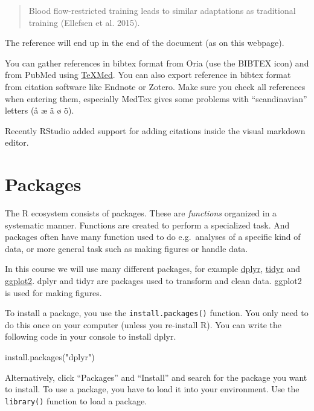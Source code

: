 \documentclass[
  11pt,
  letterpaper,
]{scrbook}
\newenvironment{Shaded}{\begin{snugshade}}{\end{snugshade}}
\newcommand{\FunctionTok}[1]{\textcolor[rgb]{0.28,0.35,0.67}{#1}}
\newcommand{\NormalTok}[1]{\textcolor[rgb]{0.00,0.23,0.31}{#1}}
\newcommand{\StringTok}[1]{\textcolor[rgb]{0.13,0.47,0.30}{#1}}
\begin{document}
\begin{quote}
Blood flow-restricted training leads to similar adaptations as
traditional training (Ellefsen et al. 2015).
\end{quote}

The reference will end up in the end of the document (as on this
webpage).

You can gather references in bibtex format from Oria (use the BIBTEX
icon) and from PubMed using
\href{https://www.bioinformatics.org/texmed/}{TeXMed}. You can also
export reference in bibtex format from citation software like Endnote or
Zotero. Make sure you check all references when entering them,
especially MedTex gives some problems with ``scandinavian'' letters (å æ
ä ø ö).

Recently RStudio added support for adding citations inside the visual
markdown editor.

\hypertarget{packages}{%
\section{Packages}\label{packages}}

The R ecosystem consists of packages. These are \emph{functions}
organized in a systematic manner. Functions are created to perform a
specialized task. And packages often have many function used to do
e.g.~analyses of a specific kind of data, or more general task such as
making figures or handle data.

In this course we will use many different packages, for example
\href{https://dplyr.tidyverse.org/}{dplyr},
\href{https://tidyr.tidyverse.org/}{tidyr} and
\href{https://ggplot2.tidyverse.org/}{ggplot2}. dplyr and tidyr are
packages used to transform and clean data. ggplot2 is used for making
figures.

To install a package, you use the \texttt{install.packages()} function.
You only need to do this once on your computer (unless you re-install
R). You can write the following code in your console to install dplyr.

\begin{Shaded}
\begin{Highlighting}[numbers=left,,]
\FunctionTok{install.packages}\NormalTok{(}\StringTok{"dplyr"}\NormalTok{)}
\end{Highlighting}
\end{Shaded}

Alternatively, click ``Packages'' and ``Install'' and search for the
package you want to install. To use a package, you have to load it into
your environment. Use the \texttt{library()} function to load a package.
\end{document}
